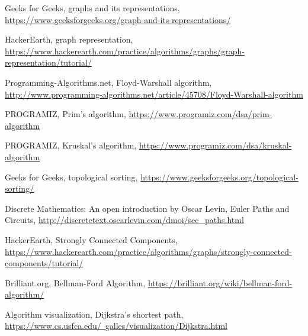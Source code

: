 \begin{thebibliography}{9}
Geeks for Geeks, graphs and its representations, \href{https://www.geeksforgeeks.org/graph-and-its-representations/}{https://www.geeksforgeeks.org/graph-and-its-representations/}

HackerEarth, graph representation, \href{https://www.hackerearth.com/practice/algorithms/graphs/graph-representation/tutorial/}{https://www.hackerearth.com/practice/algorithms/graphs/graph-representation/tutorial/}

Programming-Algorithms.net, Floyd-Warshall algorithm, \href{http://www.programming-algorithms.net/article/45708/Floyd-Warshall-algorithm}{http://www.programming-algorithms.net/article/45708/Floyd-Warshall-algorithm}

PROGRAMIZ, Prim's algorithm, \href{https://www.programiz.com/dsa/prim-algorithm}{https://www.programiz.com/dsa/prim-algorithm}

PROGRAMIZ, Kruskal's algorithm, \href{https://www.programiz.com/dsa/kruskal-algorithm}{https://www.programiz.com/dsa/kruskal-algorithm}

Geeks for Geeks, topological sorting, \href{https://www.geeksforgeeks.org/topological-sorting/}{https://www.geeksforgeeks.org/topological-sorting/}

Discrete Mathematics: An open introduction by Oscar Levin, Euler Paths and Circuits, \href{http://discretetext.oscarlevin.com/dmoi/sec_paths.html}{http://discretetext.oscarlevin.com/dmoi/sec\_paths.html}

HackerEarth, Strongly Connected Components, \href{https://www.hackerearth.com/practice/algorithms/graphs/strongly-connected-components/tutorial/}{https://www.hackerearth.com/practice/algorithms/graphs/strongly-connected-components/tutorial/}

Brilliant.org, Bellman-Ford Algorithm, \href{https://brilliant.org/wiki/bellman-ford-algorithm/}{https://brilliant.org/wiki/bellman-ford-algorithm/}

Algorithm visualization, Dijkstra's shortest path, \href{https://www.cs.usfca.edu/~galles/visualization/Dijkstra.html}{https://www.cs.usfca.edu/~galles/visualization/Dijkstra.html}

\end{thebibliography}
